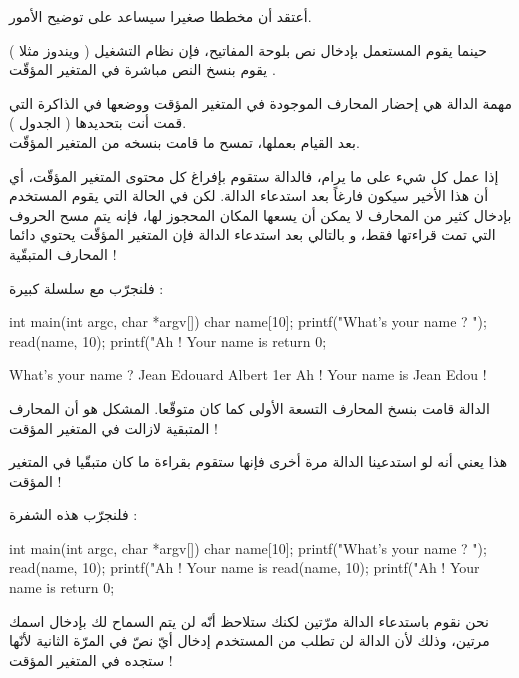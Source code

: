أعتقد أن مخططا صغيرا سيساعد على توضيح الأمور.


حينما يقوم المستعمل بإدخال نص بلوحة المفاتيح، فإن نظام التشغيل ( ويندوز مثلا ) يقوم بنسخ النص مباشرة في المتغير المؤقّت
.

مهمة الدالة
هي إحضار المحارف الموجودة في المتغير المؤقت ووضعها في الذاكرة التي قمت أنت بتحديدها ( الجدول
 ).\\
بعد القيام بعملها، تمسح ما قامت بنسخه من المتغير المؤقّت.

إذا عمل كل شيء على ما يرام، فالدالة
ستقوم بإفراغ كل محتوى المتغير المؤقّت، أي أن هذا الأخير سيكون فارغاً بعد استدعاء الدالة. لكن في الحالة التي يقوم المستخدم بإدخال كثير من المحارف لا يمكن أن يسعها المكان المحجوز لها، فإنه يتم مسح الحروف التي تمت قراءتها فقط، و بالتالي بعد استدعاء الدالة
فإن المتغير المؤقّت يحتوي دائما المحارف المتبقّية !

فلنجرّب مع سلسلة كبيرة :

\begin{Csource}
  int main(int argc, char *argv[])
  {
  	char name[10];
  	printf("What's your name ? ");
  	read(name, 10);
  	printf("Ah ! Your name is %
  	return 0;
  }
\end{Csource}

\begin{Console}
  What's your name ? Jean Edouard Albert 1er
  Ah ! Your name is Jean Edou !
\end{Console}

الدالة
قامت بنسخ المحارف التسعة الأولى كما كان متوقّعا. المشكل هو أن المحارف المتبقية لازالت في المتغير المؤقت !


هذا يعني أنه لو استدعينا الدالة
مرة أخرى فإنها ستقوم بقراءة ما كان متبقّيا في المتغير المؤقت !

فلنجرّب هذه الشفرة :

\begin{Csource}
  int main(int argc, char *argv[])
  {
  	char name[10];
  	printf("What's your name ? ");
  	read(name, 10);
  	printf("Ah ! Your name is %
  	read(name, 10);
  	printf("Ah ! Your name is %
  	return 0;
  }
\end{Csource}

نحن نقوم باستدعاء الدالة
مرّتين لكنك ستلاحظ أنّه لن يتم السماح لك بإدخال اسمك مرتين، وذلك لأن الدالة
لن تطلب من المستخدم إدخال أيّ نصّ في المرّة الثانية لأنّها ستجده في المتغير المؤقت !

